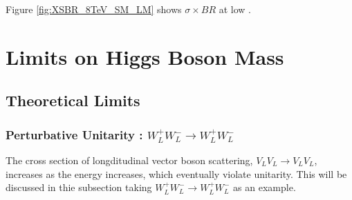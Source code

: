 Figure \ref{fig:XSBR_8TeV_SM_LM} shows $\sigma \times BR$ at low \mHi.


\newpage
\section{Limits on Higgs Boson Mass} 

\subsection{Theoretical Limits} 

\subsubsection{Perturbative Unitarity : $W_L^+W_L^- \rightarrow W_L^+W_L^-$}
The cross section of longditudinal vector boson scattering, $V_LV_L \to V_LV_L$, 
increases as the energy increases, which eventually violate unitarity. 
This will be discussed in thie subsection taking  $W_L^+W_L^- \to W_L^+W_L^-$
as an example. 
